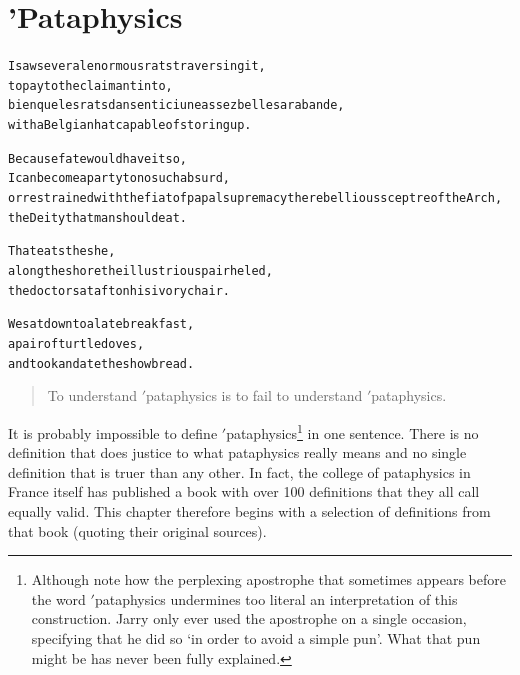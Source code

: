 
\chapter[Pataphysics]{'Pataphysics}
\label{ch:pataphysics}

\startcontents[chapters]

\vfill

\begin{alltt}\sffamily
I saw several enormous rats traversing it,
to pay to the claimant into,
bien que les rats dansent ici une assez belle sarabande,
with a Belgian hat capable of storing up.

Because fate would have it so,
I can become a party to no such absurd,
or restrained with the fiat of papal supremacy the rebellious sceptre of the Arch,
the Deity that man should eat.

That eats the she,
along the shore the illustrious pair he led,
the doctor sat aft on his ivory chair.

We sat down to a late breakfast,
a pair of turtledoves,
and took and ate the showbread.
\end{alltt}

\newpage
\minicontents
\spirals


\begin{quotation}
  To understand $'$pataphysics is to fail to understand $'$pataphysics. 
\end{quotation}

It is probably impossible to define $'$pataphysics\footnote{Although note how the perplexing apostrophe that sometimes appears before the word $'$pataphysics undermines too literal an interpretation of this construction. Jarry only ever used the apostrophe on a single occasion, specifying that he did so `in order to avoid a simple pun'. What that pun might be has never been fully explained.} in one sentence. There is no definition that does justice to what pataphysics really means and no single definition that is truer than any other. In fact, the college of pataphysics in France itself has published a book \autocite{Brotchie2003} with over 100 definitions that they all call equally valid. This chapter therefore begins with a selection of definitions from that book (quoting their original sources).

